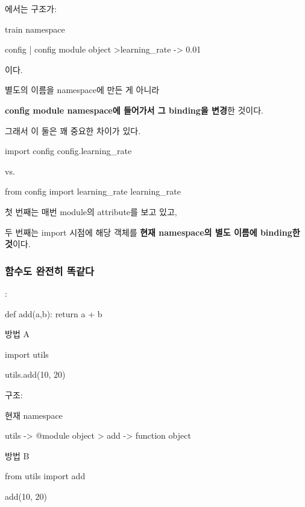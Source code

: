 에서는 구조가:

\begin{dhkdir}
train namespace

config
| config module object
>learning_rate -> 0.01
\end{dhkdir}

이다.

별도의 이름을  namespace에 만든 게 아니라

\textbf{config module namespace에 들어가서 그 binding을 변경}한 것이다.

그래서 이 둘은 꽤 중요한 차이가 있다.

\begin{dhkcode}
import config
config.learning_rate
\end{dhkcode}

    vs.

\begin{dhkcode}
from config import learning_rate
learning_rate
\end{dhkcode}

첫 번째는 매번  module의 attribute를 보고 있고,

두 번째는 import 시점에 해당 객체를 \textbf{현재 namespace의 별도 이름에 binding한 것}이다.

\subsubsection{함수도 완전히 똑같다}

:

\begin{dhkcode}
def add(a,b):
    return a + b
\end{dhkcode}

방법 A

\begin{dhkcode}
import utils

utils.add(10, 20)
\end{dhkcode}

구조:

\begin{dhkdir}
현재 namespace

utils -> @module object
> add -> function object
\end{dhkdir}

방법 B

\begin{dhkcode}
from utils import add

add(10, 20)
\end{dhkcode}

